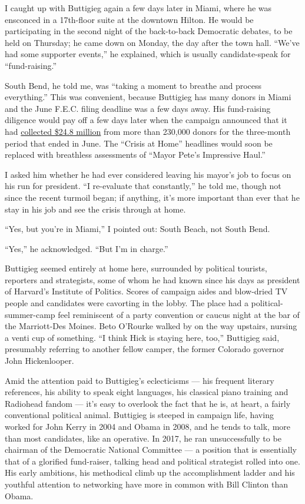 I caught up with Buttigieg again a few days later in Miami, where he was
ensconced in a 17th-floor suite at the downtown Hilton. He would be
participating in the second night of the back-to-back Democratic
debates, to be held on Thursday; he came down on Monday, the day after
the town hall. ``We've had some supporter events,'' he explained, which
is usually candidate-speak for ``fund-raising.''

South Bend, he told me, was ``taking a moment to breathe and process
everything.'' This was convenient, because Buttigieg has many donors in
Miami and the June F.E.C. filing deadline was a few days away. His
fund-raising diligence would pay off a few days later when the campaign
announced that it had
\href{https://www.nytimes3xbfgragh.onion/2019/07/01/us/politics/pete-buttigieg-fundraising.html}{collected
\$24.8 million} from more than 230,000 donors for the three-month period
that ended in June. The ``Crisis at Home'' headlines would soon be
replaced with breathless assessments of ``Mayor Pete's Impressive
Haul.''

I asked him whether he had ever considered leaving his mayor's job to
focus on his run for president. ``I re-evaluate that constantly,'' he
told me, though not since the recent turmoil began; if anything, it's
more important than ever that he stay in his job and see the crisis
through at home.

``Yes, but you're in Miami,'' I pointed out: South Beach, not South
Bend.

``Yes,'' he acknowledged. ``But I'm in charge.''

Buttigieg seemed entirely at home here, surrounded by political
tourists, reporters and strategists, some of whom he had known since his
days as president of Harvard's Institute of Politics. Scores of campaign
aides and blow-dried TV people and candidates were cavorting in the
lobby. The place had a political-summer-camp feel reminiscent of a party
convention or caucus night at the bar of the Marriott-Des Moines. Beto
O'Rourke walked by on the way upstairs, nursing a venti cup of
something. ``I think Hick is staying here, too,'' Buttigieg said,
presumably referring to another fellow camper, the former Colorado
governor John Hickenlooper.

Amid the attention paid to Buttigieg's eclecticisms --- his frequent
literary references, his ability to speak eight languages, his classical
piano training and Radiohead fandom --- it's easy to overlook the fact
that he is, at heart, a fairly conventional political animal. Buttigieg
is steeped in campaign life, having worked for John Kerry in 2004 and
Obama in 2008, and he tends to talk, more than most candidates, like an
operative. In 2017, he ran unsuccessfully to be chairman of the
Democratic National Committee --- a position that is essentially that of
a glorified fund-raiser, talking head and political strategist rolled
into one. His early ambitions, his methodical climb up the
accomplishment ladder and his youthful attention to networking have more
in common with Bill Clinton than Obama.


